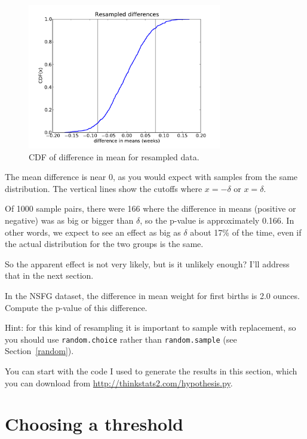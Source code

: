 \documentclass[12pt]{book}
\begin{document}
\begin{figure}
\centerline{\includegraphics[height=2.5in]{figs/length_deltas_cdf.pdf}}
\caption{CDF of difference in mean for resampled data.}
\label{length_deltas_cdf}
\end{figure}

The mean difference is near 0, as you would expect with samples
from the same distribution.  The vertical lines show the cutoffs where
$x = -\delta$ or $x = \delta$.

Of 1000 sample pairs, there were 166 where the difference in means
(positive or negative) was as big or bigger than $\delta$, so the
p-value is approximately 0.166.  In other words, we expect to see an
effect as big as $\delta$ about 17\% of the time, even if the actual
distribution for the two groups is the same.

So the apparent effect is not very likely, but is it unlikely enough?
I'll address that in the next section.

\begin{exercise}
In the NSFG dataset, the difference in mean weight for first
births is 2.0 ounces.  Compute the p-value of this difference.

Hint: for this kind of resampling it is important to sample
with replacement, so you should use {\tt random.choice} rather
than {\tt random.sample} (see Section~\ref{random}).

You can start with the code I used to generate the results in this
section, which you can download from \url{http://thinkstats2.com/hypothesis.py}.

\end{exercise}


\section{Choosing a threshold}
\label{threshold}
\end{document}
